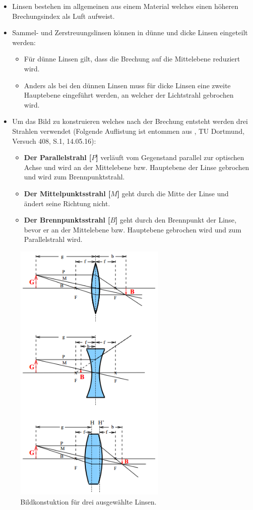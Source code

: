 \begin{itemize}
	\item Linsen bestehen im allgemeinen aus einem Material welches einen höheren Brechungsindex als Luft aufweist.
	\item Sammel- und Zerstreuungslinsen können in dünne und dicke Linsen eingeteilt werden:
	\begin{itemize}
		\item Für dünne Linsen gilt, dass die Brechung auf die Mittelebene reduziert wird.
		\item Anders als bei den dünnen Linsen muss für dicke Linsen eine zweite Hauptebene eingeführt werden, an welcher der Lichtstrahl gebrochen wird.
	\end{itemize}
	\item Um das Bild zu konstruieren welches nach der Brechung entsteht werden drei Strahlen verwendet (Folgende Auflistung ist entommen aus \cite{sample}, TU Dortmund, Versuch 408, S.1, 14.05.16):
	\begin{itemize}
		\item \textbf{Der Parallelstrahl [$P$]} verläuft vom Gegenstand parallel zur optischen Achse und wird an der Mittelebene bzw. Hauptebene der Linse gebrochen und wird zum Brennpunktstrahl.
		\item \textbf{Der Mittelpunktsstrahl [$M$]} geht durch die Mitte der Linse und ändert seine Richtung nicht.
		\item \textbf{Der Brennpunktsstrahl [$B$]} geht durch den Brennpunkt der Linse, bevor er an der Mittelebene bzw. Hauptebene gebrochen wird und zum Parallelstrahl wird.
	\end{itemize}
\end{itemize}

\begin{figure}[H]
	\centering
	\includegraphics[height=13cm]{picture/Bild1}
	\caption{Bildkonstuktion für drei ausgewählte Linsen. \cite[1]{sample}}
	\label{fig:Bildkonstruktion}
\end{figure}

